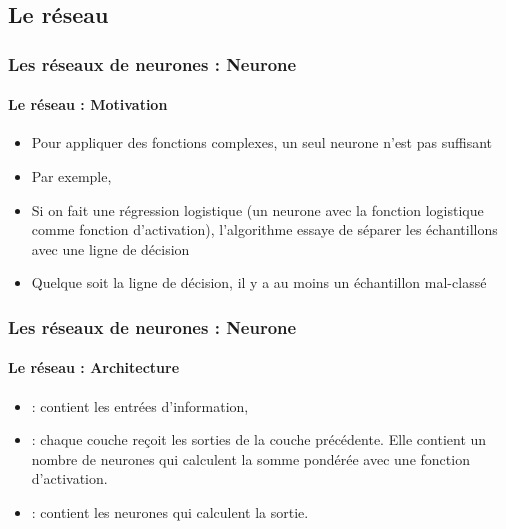 \documentclass[xcolor=table]{beamer}
\begin{document}
\subsection{Le réseau}

\begin{frame}
\frametitle{Les réseaux de neurones : Neurone}
\framesubtitle{Le réseau : Motivation}

\begin{minipage}{0.59\textwidth}
\begin{itemize}
	\item Pour appliquer des fonctions complexes, un seul neurone n'est pas suffisant
	\item Par exemple, 
	\item Si on fait une régression logistique (un neurone avec la fonction logistique comme fonction d'activation), l'algorithme essaye de séparer les échantillons avec une ligne de décision
	\item Quelque soit la ligne de décision, il y a au moins un échantillon mal-classé
\end{itemize}
\end{minipage}
\begin{minipage}{0.4\textwidth}
\end{minipage}

\end{frame}

\begin{frame}
\frametitle{Les réseaux de neurones : Neurone}
\framesubtitle{Le réseau : Architecture}

\begin{minipage}{0.59\textwidth}
	\begin{itemize}
		\item {} : contient les entrées d'information,  
		\item {} : chaque couche reçoit les sorties de la couche précédente. 
		Elle contient un nombre de neurones qui calculent la somme pondérée avec une fonction d'activation. 
		\item {} : contient les neurones qui calculent la sortie. 
	\end{itemize}
\end{minipage}
\begin{minipage}{0.4\textwidth}
\end{minipage}

\end{frame}
\end{document}
